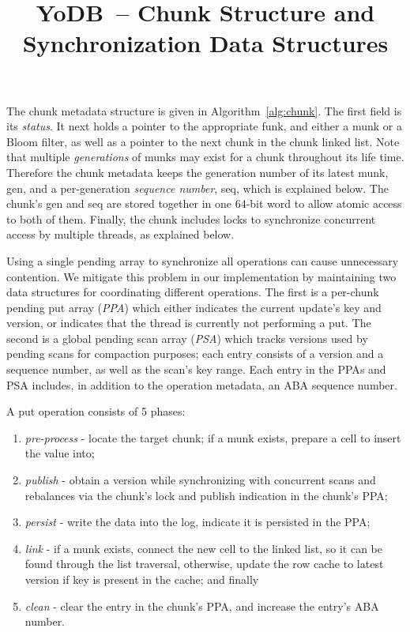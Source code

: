 \documentclass[letterpaper,twocolumn,10pt]{article}
\date{}
\newcommand{\code}[1]{\textsf{\fontsize{9}{11}\selectfont #1}}
\newcommand{\sys}{YoDB}
\begin{document}
\title{\sys\ -- Chunk Structure and Synchronization Data Structures} 
\author{}
\maketitle

The chunk metadata structure is given in Algorithm~\ref{alg:chunk}. 
The first field is its \emph{status}. 
It next holds a pointer to the appropriate funk, and either a munk or a Bloom filter, as well as a pointer to the next 
chunk in the chunk linked list.
Note that multiple \emph{generations} of munks may exist for a chunk throughout its life time.
Therefore the chunk metadata keeps the generation number of its latest munk, \code{gen}, and a per-generation \emph{sequence number},
\code{seq}, which is explained below. The chunk's \code{gen} and \code{seq} are stored together in one 64-bit word to allow 
atomic access to both of them. 
Finally, the chunk includes locks to synchronize concurrent access by multiple threads, as explained below.

Using a single pending array to synchronize all
operations can cause unnecessary contention.
We mitigate this problem in our implementation by maintaining two data structures for coordinating different operations. The first is a per-chunk pending put array (\emph{PPA}) which 
either indicates the current update's key and version, or indicates that the thread is currently not performing a put.
The second is a global pending scan array (\emph{PSA}) which tracks versions used by pending scans for compaction purposes; each entry consists of a version and a sequence number, as well as the scan’s key range. Each entry in the \code{PPA}s and \code{PSA} includes, in addition to the operation metadata, an ABA sequence number. 

A put operation consists of 5 phases: 
\begin{enumerate}\itemsep0pt
\item \emph{pre-process} - locate the target chunk; if a munk exists, prepare a cell to insert the value into; 
\item \emph{publish} - obtain a version while synchronizing with concurrent scans and rebalances via the chunk's lock and publish indication in the chunk's \code{PPA}; 
\item \emph{persist} - write the data into the log, indicate it is persisted in the \code{PPA}; 
\item \emph{link} - if a munk exists, connect the new cell to the linked list, so it can be found through the list traversal, otherwise, update the row cache to latest version if key is present in the cache; and finally
\item \emph{clean} - clear the entry in the chunk's \code{PPA}, and increase the entry's ABA number.
\end{enumerate}
\end{document}
